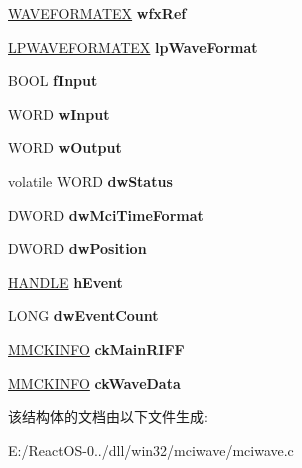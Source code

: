 \begin{DoxyCompactItemize}
\hyperlink{struct_w_a_v_e_f_o_r_m_a_t_e_x}{W\+A\+V\+E\+F\+O\+R\+M\+A\+T\+EX} {\bfseries wfx\+Ref}
\item 
\mbox{\label{struct_w_i_n_e___m_c_i_w_a_v_e_a93d6598dfdee1408fca98a6b0c9fa94b}} 
\hyperlink{struct___w_a_v_e_f_o_r_m_a_t_e_x}{L\+P\+W\+A\+V\+E\+F\+O\+R\+M\+A\+T\+EX} {\bfseries lp\+Wave\+Format}
\item 
\mbox{\label{struct_w_i_n_e___m_c_i_w_a_v_e_a2298a305d0b4c2423ee8fa1bc0bb4abc}} 
B\+O\+OL {\bfseries f\+Input}
\item 
\mbox{\label{struct_w_i_n_e___m_c_i_w_a_v_e_a2369176c8493a502c5134a70086ac0a1}} 
W\+O\+RD {\bfseries w\+Input}
\item 
\mbox{\label{struct_w_i_n_e___m_c_i_w_a_v_e_aff0ef8b1b2ffcb3214db02b38ff2c2c4}} 
W\+O\+RD {\bfseries w\+Output}
\item 
\mbox{\label{struct_w_i_n_e___m_c_i_w_a_v_e_acd3d77e851d13fbc041c002206c313a7}} 
volatile W\+O\+RD {\bfseries dw\+Status}
\item 
\mbox{\label{struct_w_i_n_e___m_c_i_w_a_v_e_a883687eaf06d273dfbf920127f48eb33}} 
D\+W\+O\+RD {\bfseries dw\+Mci\+Time\+Format}
\item 
\mbox{\label{struct_w_i_n_e___m_c_i_w_a_v_e_aa4f25ff88f6ff1748cac779499083f33}} 
D\+W\+O\+RD {\bfseries dw\+Position}
\item 
\mbox{\label{struct_w_i_n_e___m_c_i_w_a_v_e_a670cba79aaa0422b019f1d66ca0ec0af}} 
\hyperlink{interfacevoid}{H\+A\+N\+D\+LE} {\bfseries h\+Event}
\item 
\mbox{\label{struct_w_i_n_e___m_c_i_w_a_v_e_a953d31b26133752ba5f06701ec64fa60}} 
L\+O\+NG {\bfseries dw\+Event\+Count}
\item 
\mbox{\label{struct_w_i_n_e___m_c_i_w_a_v_e_a4e666f61e4914de21fb9720aa1d74070}} 
\hyperlink{struct___m_m_c_k_i_n_f_o}{M\+M\+C\+K\+I\+N\+FO} {\bfseries ck\+Main\+R\+I\+FF}
\item 
\mbox{\label{struct_w_i_n_e___m_c_i_w_a_v_e_a2d18a587209edcb5615258c6ceff9ffb}} 
\hyperlink{struct___m_m_c_k_i_n_f_o}{M\+M\+C\+K\+I\+N\+FO} {\bfseries ck\+Wave\+Data}
\end{DoxyCompactItemize}


该结构体的文档由以下文件生成\+:\begin{DoxyCompactItemize}
\item 
E\+:/\+React\+O\+S-\/0../dll/win32/mciwave/mciwave.\+c\end{DoxyCompactItemize}

